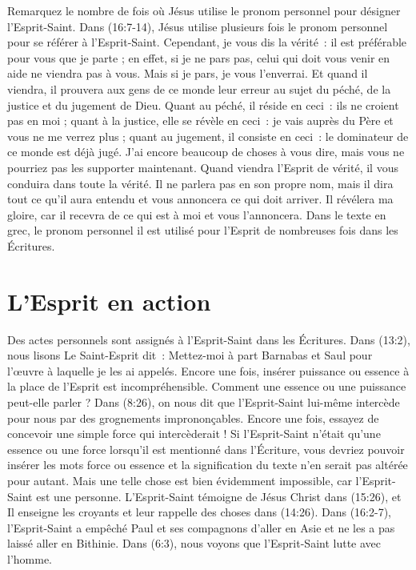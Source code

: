 Remarquez le nombre de fois où Jésus utilise le pronom personnel pour
 désigner l'Esprit-Saint. Dans (16:7-14), Jésus utilise
 plusieurs fois le pronom personnel pour se référer à l'Esprit-Saint.
 \og Cependant, je vous dis la vérité~: il est préférable pour vous que
 je parte ; en effet, si je ne pars pas, celui qui doit vous venir en aide
 ne viendra pas à vous. Mais si je pars, je vous l'enverrai. Et quand il
 viendra, il prouvera aux gens de ce monde leur erreur au sujet du péché,
 de la justice et du jugement de Dieu. Quant au péché, il réside en ceci~:
 ils ne croient pas en moi ; quant à la justice, elle se révèle en ceci~:
 je vais auprès du Père et vous ne me verrez plus ; quant au jugement,
 il consiste en ceci~: le dominateur de ce monde est déjà jugé.
 J'ai encore beaucoup de choses à vous dire, mais vous ne pourriez pas les
 supporter maintenant. Quand viendra l'Esprit de vérité, il vous conduira
 dans toute la vérité. Il ne parlera pas en son propre nom, mais il dira tout
 ce qu'il aura entendu et vous annoncera ce qui doit arriver.
 Il révélera ma gloire, car il recevra de ce qui est à moi et vous
 l'annoncera.
 \fg{} Dans le texte en grec, le pronom personnel \og il \fg{} est utilisé
 pour l'Esprit de nombreuses fois dans les Écritures.

\section*{L'Esprit en action}

Des actes personnels sont assignés à l'Esprit-Saint dans les Écritures. Dans
 (13:2), nous lisons \og Le Saint-Esprit dit~:
 Mettez-moi à part Barnabas et Saul pour l'œuvre à laquelle je les ai
 appelés. \fg{}
 Encore une fois, insérer \og puissance \fg{} ou \og essence \fg{} à la place
 de l'Esprit est incompréhensible. Comment une essence ou une puissance
 peut-elle parler ? Dans (8:26), on nous dit que l'Esprit-Saint
 lui-même intercède pour nous par des grognements imprononçables.
 Encore une fois, essayez de concevoir une simple force qui intercèderait !
 Si l'Esprit-Saint n'était qu'une essence ou une force lorsqu'il est mentionné
 dans l'Écriture, vous devriez pouvoir insérer les mots \og force \fg{} ou
 \og essence \fg{} et la signification du texte n'en serait pas altérée pour
 autant. Mais une telle chose est bien évidemment impossible, car
 l'Esprit-Saint est une personne. L'Esprit-Saint témoigne de Jésus Christ dans
 (15:26), et Il enseigne les croyants et leur rappelle des choses
 dans (14:26). Dans (16:2-7), l'Esprit-Saint a
 empêché Paul et ses compagnons d'aller en Asie et ne les a pas laissé aller
 en Bithinie. Dans (6:3), nous voyons que l'Esprit-Saint lutte
 avec l'homme.

